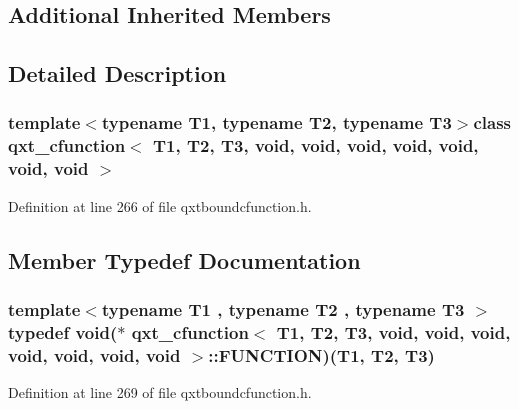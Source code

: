 \subsection*{Additional Inherited Members}


\subsection{Detailed Description}
\subsubsection*{template$<$typename T1, typename T2, typename T3$>$class qxt\-\_\-cfunction$<$ T1, T2, T3, void, void, void, void, void, void, void $>$}



Definition at line 266 of file qxtboundcfunction.\-h.



\subsection{Member Typedef Documentation}
\hypertarget{classqxt__cfunction_3_01_t1_00_01_t2_00_01_t3_00_01void_00_01void_00_01void_00_01void_00_01void_00_01void_00_01void_01_4_a73c3c0733711062826233257e1827edf}{
\subsubsection[{F\-U\-N\-C\-T\-I\-O\-N}]{\setlength{\rightskip}{0pt plus 5cm}template$<$typename T1 , typename T2 , typename T3 $>$ typedef {\bf void}($\ast$ {\bf qxt\-\_\-cfunction}$<$ T1, T2, T3, {\bf void}, {\bf void}, {\bf void}, {\bf void}, {\bf void}, {\bf void}, {\bf void} $>$\-::F\-U\-N\-C\-T\-I\-O\-N)(T1, T2, T3)}}\label{classqxt__cfunction_3_01_t1_00_01_t2_00_01_t3_00_01void_00_01void_00_01void_00_01void_00_01void_00_01void_00_01void_01_4_a73c3c0733711062826233257e1827edf}


Definition at line 269 of file qxtboundcfunction.\-h.



